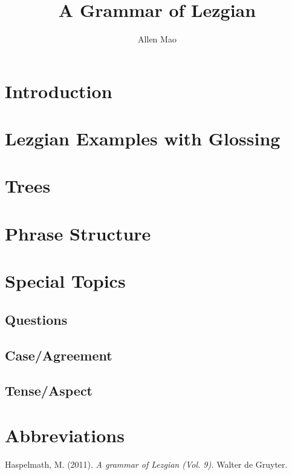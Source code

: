 \documentclass[12pt, letterpaper]{article}
\title{A Grammar of Lezgian}
\date{}
\author{Allen Mao}
\begin{document}
\maketitle
\section{Introduction}
\label{sec:intro}

\section*{Lezgian Examples with Glossing}

\section*{Trees}
\label{sec:trees}

\section{Phrase Structure}

\section{Special Topics}
\label{sec:spec-topics}
\subsection{Questions}

\subsection{Case/Agreement}
\label{subsec:case}

\subsection{Tense/Aspect}

\section{Abbreviations}
\printglossaries
\begin{thebibliography}{}
Haspelmath, M. (2011). \textit{A grammar of Lezgian (Vol. 9).} Walter de Gruyter.

\end{thebibliography}
\end{document}
